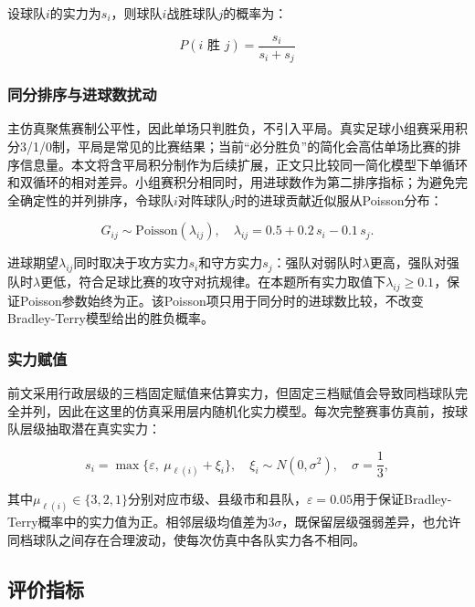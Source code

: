 \documentclass[12pt,a4paper]{article}
\begin{document}
设球队$i$的实力为$s_i$，则球队$i$战胜球队$j$的概率为：

\begin{equation}
  P(i \text{ 胜 } j) = \frac{s_i}{s_i + s_j}
  \label{eq:bt}
\end{equation}

\subsubsection{同分排序与进球数扰动}

主仿真聚焦赛制公平性，因此单场只判胜负，不引入平局。真实足球小组赛采用积分3/1/0制，平局是常见的比赛结果；当前“必分胜负”的简化会高估单场比赛的排序信息量。本文将含平局积分制作为后续扩展，正文只比较同一简化模型下单循环和双循环的相对差异。小组赛积分相同时，用进球数作为第二排序指标；为避免完全确定性的并列排序，令球队$i$对阵球队$j$时的进球贡献近似服从Poisson分布：

\begin{equation}
  G_{ij} \sim \text{Poisson}(\lambda_{ij}),\quad \lambda_{ij} = 0.5 + 0.2\,s_i - 0.1\,s_j.
  \label{eq:poisson}
\end{equation}

进球期望$\lambda_{ij}$同时取决于攻方实力$s_i$和守方实力$s_j$：强队对弱队时$\lambda$更高，强队对强队时$\lambda$更低，符合足球比赛的攻守对抗规律。在本题所有实力取值下$\lambda_{ij} \geq 0.1$，保证Poisson参数始终为正。该Poisson项只用于同分时的进球数比较，不改变Bradley-Terry模型给出的胜负概率。

\subsubsection{实力赋值}

前文采用行政层级的三档固定赋值来估算实力，但固定三档赋值会导致同档球队完全并列，因此在这里的仿真采用层内随机化实力模型。每次完整赛事仿真前，按球队层级抽取潜在真实实力：

\begin{equation}
  s_i=\max\{\varepsilon,\ \mu_{\ell(i)}+\xi_i\},\quad
  \xi_i\sim N(0,\sigma^2),\quad \sigma=\frac{1}{3},
  \label{eq:random_strength}
\end{equation}

其中$\mu_{\ell(i)}\in\{3,2,1\}$分别对应市级、县级市和县队，$\varepsilon=0.05$用于保证Bradley-Terry概率中的实力值为正。相邻层级均值差为$3\sigma$，既保留层级强弱差异，也允许同档球队之间存在合理波动，使每次仿真中各队实力各不相同。

\subsection{评价指标}
\end{document}
